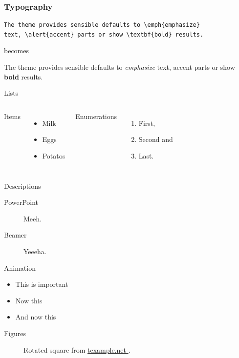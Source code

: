 \documentclass[10pt, compress]{beamer}
\newcommand{\ehref}[2]{\href{#1}{#2 \hspace{-.2em}{\scriptsize\faExternalLink}}}
\begin{document}
\begin{frame}[fragile]
  \frametitle{Typography}
      \begin{verbatim}
The theme provides sensible defaults to \emph{emphasize}
text, \alert{accent} parts or show \textbf{bold} results.
      \end{verbatim}

  \begin{center}becomes\end{center}

  The theme provides sensible defaults to \emph{emphasize} text,
  \alert{accent} parts or show \textbf{bold} results.
\end{frame}
\begin{frame}{Lists}
  \begin{columns}[onlytextwidth]
      Items
      \begin{itemize}
        \item Milk \item Eggs \item Potatos
      \end{itemize}

      Enumerations
      \begin{enumerate}
        \item First, \item Second and \item Last.
      \end{enumerate}
  \end{columns}
\end{frame}
\begin{frame}{Descriptions}
  \begin{description}
    \item[PowerPoint] Meeh.
    \item[Beamer] Yeeeha.
  \end{description}
\end{frame}
\begin{frame}{Animation}
  \begin{itemize}[<+- | alert@+>]
    \item \alert<4>{This is important}
    \item Now this
    \item And now this
  \end{itemize}
\end{frame}
\begin{frame}{Figures}
  \begin{figure}
    \setcounter{density}{20}
    
    \caption{Rotated square from
    \ehref{http://www.texample.net/tikz/examples/rotated-polygons/}{texample.net}.}
  \end{figure}
\end{frame}
\end{document}

